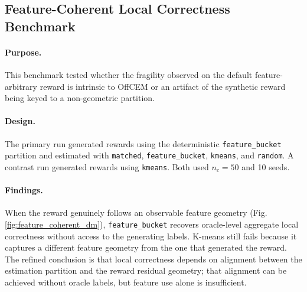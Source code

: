 \documentclass[11pt]{article}
\begin{document}




\subsection{Feature-Coherent Local Correctness Benchmark}

\paragraph{Purpose.}
This benchmark tested whether the fragility observed on the default feature-arbitrary reward is intrinsic to OffCEM or an artifact of the synthetic reward being keyed to a non-geometric partition.



\paragraph{Design.}
The primary run generated rewards using the deterministic \texttt{feature\_bucket} partition and estimated with \texttt{matched}, \texttt{feature\_bucket}, \texttt{kmeans}, and \texttt{random}. A contrast run generated rewards using \texttt{kmeans}. Both used $n_c=50$ and 10 seeds.


\paragraph{Findings.}
When the reward genuinely follows an observable feature geometry (Fig. \ref{fig:feature_coherent_dm}), \texttt{feature\_bucket} recovers oracle-level aggregate local correctness without access to the generating labels. K-means still fails because it captures a different  feature geometry from the one that generated the reward. The refined conclusion is that local correctness depends on alignment between the estimation partition and the reward residual geometry; that alignment can be achieved without oracle labels, but feature use alone is insufficient.
\end{document}
